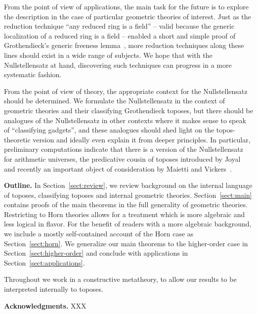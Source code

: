 \documentclass[oneside,reqno]{amsart}
\theoremstyle{definition}
\theoremstyle{plain}
\theoremstyle{remark}
\renewcommand{\_}{\mathpunct{.}\,}
\newcommand{\?}{\,{:}\,}
\renewcommand{\paragraph}[1]{\noindent\textbf{#1.}}
\begin{document}
From the point of view of applications, the main task for the future is to
explore the description in the case of particular geometric theories of
interest. Just as the reduction technique ``any reduced ring is a field'' --
valid because the generic localization of a reduced ring is a field -- enabled
a short and simple proof of Grothendieck's generic freeness
lemma~\cite[Section~11.5]{blechschmidt:phd}, more reduction techniques along
these lines should exist in a wide range of subjects. We hope that with the
Nullstellensatz at hand, discovering such techniques can progress in a more
systematic fashion.

From the point of view of theory, the appropriate context for the
Nullstellensatz should be determined. We formulate the Nullstellensatz in the
context of geometric theories and their classifying Grothendieck toposes, but
there should be analogues of the Nullstellensatz in other contexts where it
makes sense to speak of ``classifying gadgets'', and these analogues should
shed light on the topos-theoretic version and ideally even explain it from deeper
principles. In particular, preliminary computations indicate that there is a
version of the Nullstellensatz for arithmetic universes, the predicative cousin
of toposes introduced by Joyal~\cite{XXX} and recently an important object of
consideration by Maietti and Vickers~\cite{XXX}.
\medskip


\paragraph{Outline} In Section~\ref{sect:review}, we review background on the
internal language of toposes, classifying toposes and internal geometric theories.
Section~\ref{sect:main} contains proofs of the main theorems in the
full generality of geometric theories. Restricting to Horn theories allows for
a treatment which is more algebraic and less logical in flavor. For the benefit
of readers with a more algebraic background, we include a mostly self-contained
account of the Horn case as Section~\ref{sect:horn}. We generalize our main
theorems to the higher-order case in Section~\ref{sect:higher-order} and
conclude with applications in Section~\ref{sect:applications}.

Throughout we work in a constructive metatheory, to allow our results to be
interpreted internally to toposes.
\medskip


\paragraph{Acknowledgments} XXX
\end{document}
